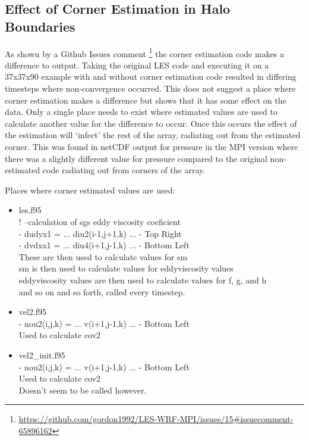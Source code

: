 \documentclass{article}
\begin{document}
\subsection{Effect of Corner Estimation in Halo Boundaries}

As shown by a Github Issues comment
\footnote{\url{https://github.com/gordon1992/LES-WRF-MPI/issues/15#issuecomment-65896162}}
the corner estimation code makes a difference to output. Taking the original LES
code and executing it on a 37x37x90 example with and without corner estimation
code resulted in differing timesteps where non-convergence occurred. This does
not suggest a place where corner estimation makes a difference but shows that it
has some effect on the data. Only a single place needs to exist where estimated
values are used to calculate another value for the difference to occur. Once
this occurs the effect of the estimation will `infect' the rest of the array,
radiating out from the estimated corner. This was found in netCDF output for
pressure in the MPI version where there was a slightly different value for
pressure compared to the original non-estimated code radiating out from corners
of the array.

Places where corner estimated values are used:

\begin{itemize}
    \item les.f95\\
    ! --calculation of sgs eddy viscosity coeficient\\
    - dudyx1 = ... diu2(i-1,j+1,k) ... - Top Right\\
    - dvdxx1 = ... diu4(i+1,j-1,k) ... - Bottom Left\\
    These are then used to calculate values for sm\\
    sm is then used to calculate values for eddyviscosity values\\
    eddyviscosity values are then used to calculate values for f, g, and h\\
    and so on and so forth, called every timestep.
    \item vel2.f95\\
    - nou2(i,j,k) = ... v(i+1,j-1,k) ... - Bottom Left \\
    Used to calculate cov2
    \item vel2\_init.f95\\
    - nou2(i,j,k) = ... v(i+1,j-1,k) ... - Bottom Left \\
    Used to calculate cov2\\
    Doesn't seem to be called however.
\end{itemize}
\end{document}
